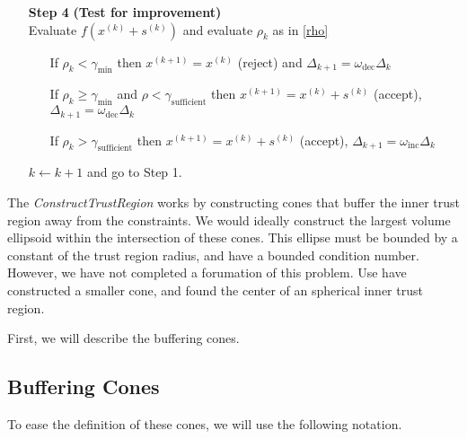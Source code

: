 \documentclass{article}
\theoremstyle{case}
\newcommand{\modelk}{{{m}_f}^{(k)}}
\newcommand{\iteratek}{{x}^{(k)}}
\newcommand{\trialk}{{{s}^{(k)}}}
\newcommand{\iteratekpone}{{x}^{(k+1)}}
\newcommand{\omegainc}{\omega_{\text{inc}}}
\newcommand{\omegadec}{\omega_{\text{dec}}}
\newcommand{\gammasm}{\gamma_{\text{min}}}
\newcommand{\gammabi}{\gamma_{\text{sufficient}}}
\begin{document}
\begin{algorithm}[H]
\begin{itemize}
        \item[\textbf{Step 4}] \textbf{(Test for improvement)} \\
            Evaluate $f(\iteratek + \trialk)$ and evaluate $\rho_k$ as in \cref{rho} \begin{itemize}
                \item[] If $\rho_k < \gammasm$ then $\iteratekpone=\iteratek$ (reject) and $\Delta_{k+1} = \omegadec\Delta_{k}$
                \item[] If $\rho_k \ge \gammasm$ and $\rho < \gammabi$ then $\iteratekpone=\iteratek+\trialk$ (accept), $\Delta_{k+1} = \omegadec\Delta_{k}$
                \item[] If $\rho_k > \gammabi$ then $\iteratekpone=\iteratek+\trialk$ (accept), $\Delta_{k+1} = \omegainc\Delta_{k}$
            \end{itemize}
            $k \gets k+1$ and go to Step 1.
    \end{itemize}
\end{algorithm}



The \emph{ConstructTrustRegion} works by constructing cones that buffer the inner trust region away from the constraints.
We would ideally construct the largest volume ellipsoid within the intersection of these cones.
This ellipse must be bounded by a constant of the trust region radius, and have a bounded condition number.
However, we have not completed a forumation of this problem.
Use have constructed a smaller cone, and found the center of an spherical inner trust region.

First, we will describe the buffering cones.


\subsection{Buffering Cones}
To ease the definition of these cones, we will use the following notation.
\end{document}
